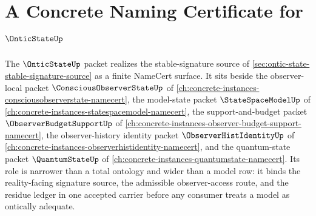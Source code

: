 \chapter{A Concrete Naming Certificate for $\OnticStateUp$}
\label{ch:concrete-instances-onticstate-namecert}

The $\OnticStateUp$ packet realizes the stable-signature source of \autoref{sec:ontic-state-stable-signature-source} as a finite NameCert surface. It sits beside the observer-local packet $\ConsciousObserverStateUp$ of \autoref{ch:concrete-instances-consciousobserverstate-namecert}, the model-state packet $\StateSpaceModelUp$ of \autoref{ch:concrete-instances-statespacemodel-namecert}, the support-and-budget packet $\ObserverBudgetSupportUp$ of \autoref{ch:concrete-instances-observer-budget-support-namecert}, the observer-history identity packet $\ObserverHistIdentityUp$ of \autoref{ch:concrete-instances-observerhistidentity-namecert}, and the quantum-state packet $\QuantumStateUp$ of \autoref{ch:concrete-instances-quantumstate-namecert}. Its role is narrower than a total ontology and wider than a model row: it binds the reality-facing signature source, the admissible observer-access route, and the residue ledger in one accepted carrier before any consumer treats a model as ontically adequate.

